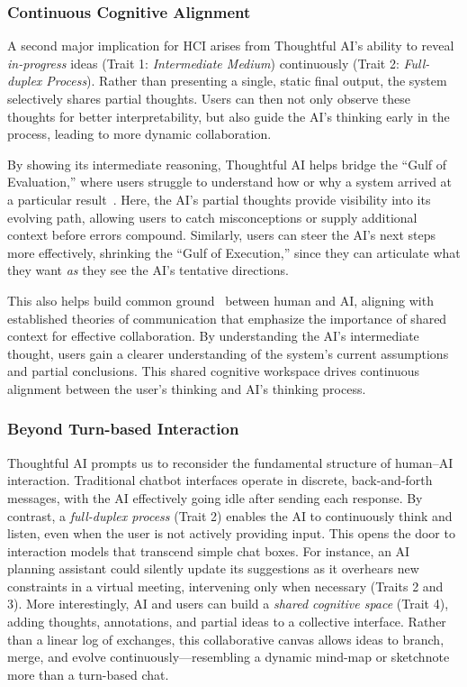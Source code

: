 \subsubsection{Continuous Cognitive Alignment}

A second major implication for HCI arises from Thoughtful AI's ability to reveal \emph{in-progress} ideas (Trait 1: \textit{Intermediate Medium}) continuously (Trait 2: \textit{Full-duplex Process}). Rather than presenting a single, static final output, the system selectively shares partial thoughts. Users can then not only observe these thoughts for better interpretability, but also guide the AI's thinking early in the process, leading to more dynamic collaboration.

By showing its intermediate reasoning, Thoughtful AI helps bridge the ``Gulf of Evaluation,'' where users struggle to understand how or why a system arrived at a particular result~\cite{norman2013design}. Here, the AI’s partial thoughts provide visibility into its evolving path, allowing users to catch misconceptions or supply additional context before errors compound. Similarly, users can steer the AI's next steps more effectively, shrinking the ``Gulf of Execution,'' since they can articulate what they want \emph{as} they see the AI’s tentative directions.

This also helps build common ground~\cite{clark1991grounding} between human and AI, aligning with established theories of communication that emphasize the importance of shared context for effective collaboration. By understanding the AI's intermediate thought, users gain a clearer understanding of the system's current assumptions and partial conclusions. This shared cognitive workspace drives continuous alignment between the user's thinking and AI's thinking process.


\subsubsection{Beyond Turn-based Interaction}
Thoughtful AI prompts us to reconsider the fundamental structure of human–AI interaction. Traditional chatbot interfaces operate in discrete, back-and-forth messages, with the AI effectively going idle after sending each response. By contrast, a \emph{full-duplex process} (Trait 2) enables the AI to continuously think and listen, even when the user is not actively providing input.
This opens the door to interaction models that transcend simple chat boxes. For instance, an AI planning assistant could silently update its suggestions as it overhears new constraints in a virtual meeting, intervening only when necessary (Traits 2 and 3). 
More interestingly, AI and users can build a \emph{shared cognitive space} (Trait 4), adding thoughts, annotations, and partial ideas to a collective interface. Rather than a linear log of exchanges, this collaborative canvas allows ideas to branch, merge, and evolve continuously---resembling a dynamic mind-map or sketchnote more than a turn-based chat.


